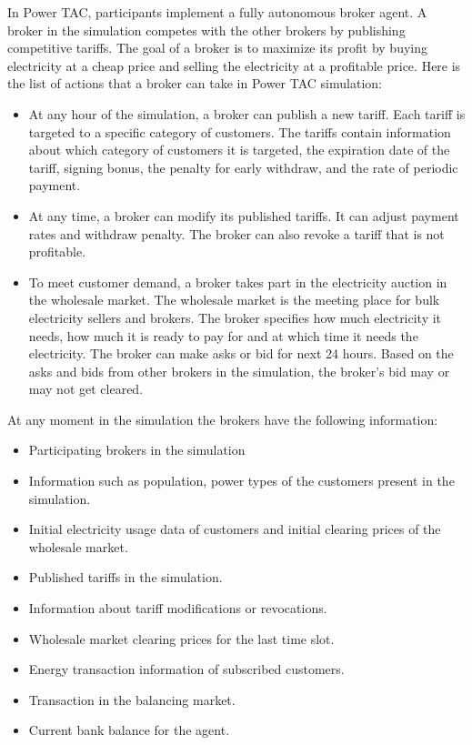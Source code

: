 In Power TAC, participants implement a fully autonomous broker agent. A broker in the simulation competes with the other brokers by publishing competitive tariffs. The goal of a broker is to maximize its profit by buying electricity at a cheap price and selling the electricity at a profitable price. Here is the list of actions that a broker can take in Power TAC simulation:
\begin{itemize}  
\item At any hour of the simulation, a broker can publish a new tariff. Each tariff is targeted to a specific category of customers. The tariffs contain information about which category of customers it is targeted, the expiration date of the tariff, signing bonus, the penalty for early withdraw, and the rate of periodic payment. 
\item At any time, a broker can modify its published tariffs. It can adjust payment rates and withdraw penalty. The broker can also revoke a tariff that is not profitable.
\item To meet customer demand, a broker takes part in the electricity auction in the wholesale market. The wholesale market is the meeting place for bulk electricity sellers and brokers. The broker specifies how much electricity it needs, how much it is ready to pay for and at which time it needs the electricity. The broker can make asks or bid for next 24 hours. Based on the asks and bids from other brokers in the simulation, the broker's bid may or may not get cleared. 
\end{itemize}

At any moment in the simulation the brokers have the following information: 
\begin{itemize}  
\item Participating brokers in the simulation 
\item Information such as population, power types of the customers present in the simulation.
\item Initial electricity usage data of customers and initial clearing prices of the wholesale market.
\item Published tariffs in the simulation.
\item Information about tariff modifications or revocations.
\item Wholesale market clearing prices for the last time slot.
\item Energy transaction information of subscribed customers.
\item Transaction in the balancing market.
\item Current bank balance for the agent.
\end{itemize}


